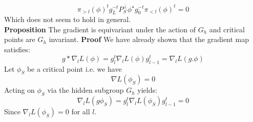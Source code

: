 \documentclass{article}
\theoremstyle{definition}
\begin{document}
\begin{equation*}
   \pi_{>l}(\phi)^{t}g_L^{-t}P_S^{\perp}\phi^{\star}g_0^{-t}\pi_{<l}(\phi)^{t} = 0
\end{equation*}
Which does not seem to hold in general.
\\
\textbf{Proposition} The gradient is equivariant under the action of $G_h$ and critical points are $G_h$ invariant.
\textbf{Proof} We have already shown that the gradient map satisfies:
\begin{equation*}
    g \ast \nabla_l L(\phi) = g_l^t\nabla_l L(\phi) g_{l-1}^t = \nabla_l L(g.\phi)
\end{equation*}
Let $\phi_S$ be a critical point i.e. we have 
\begin{equation*}
    \nabla L(\phi_S) = 0
\end{equation*}
Acting on $\phi_S$ via the hidden subgroup $G_h$ yields:
\begin{equation*}
    \nabla_l L(g\phi_S) = g_l^t\nabla_l L(\phi_S) g_{l-1}^t = 0
\end{equation*}
Since $\nabla_l L(\phi_S) = 0$ for all $l$.
\end{document}
